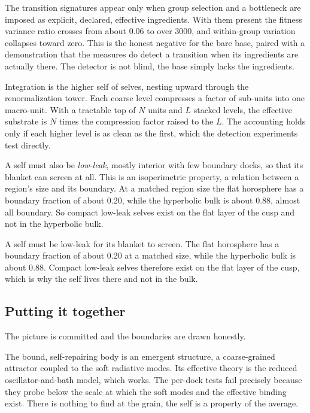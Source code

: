 The transition signatures appear only when group selection and a bottleneck are imposed as explicit, declared, effective ingredients. With them present the fitness variance ratio crosses from about $0.06$ to over $3000$, and within-group variation collapses toward zero. This is the honest negative for the bare base, paired with a demonstration that the measures do detect a transition when its ingredients are actually there. The detector is not blind, the base simply lacks the ingredients.

\begin{principle}
Integration is the higher self of selves, nesting upward through the renormalization tower. Each coarse level compresses a factor of sub-units into one macro-unit. With a tractable top of $N$ units and $L$ stacked levels, the effective substrate is $N$ times the compression factor raised to the $L$. The accounting holds only if each higher level is as clean as the first, which the detection experiments test directly.
\end{principle}

A self must also be \emph{low-leak}, mostly interior with few boundary docks, so that its blanket can screen at all. This is an isoperimetric property, a relation between a region's size and its boundary. At a matched region size the flat horosphere has a boundary fraction of about $0.20$, while the hyperbolic bulk is about $0.88$, almost all boundary. So compact low-leak selves exist on the flat layer of the cusp and not in the hyperbolic bulk.

\begin{result}
A self must be low-leak for its blanket to screen. The flat horosphere has a boundary fraction of about $0.20$ at a matched size, while the hyperbolic bulk is about $0.88$. Compact low-leak selves therefore exist on the flat layer of the cusp, which is why the self lives there and not in the bulk.
\end{result}

\subsection{Putting it together}

The picture is committed and the boundaries are drawn honestly.

The bound, self-repairing body is an emergent structure, a coarse-grained attractor coupled to the soft radiative modes. Its effective theory is the reduced oscillator-and-bath model, which works. The per-dock tests fail precisely because they probe below the scale at which the soft modes and the effective binding exist. There is nothing to find at the grain, the self is a property of the average.

